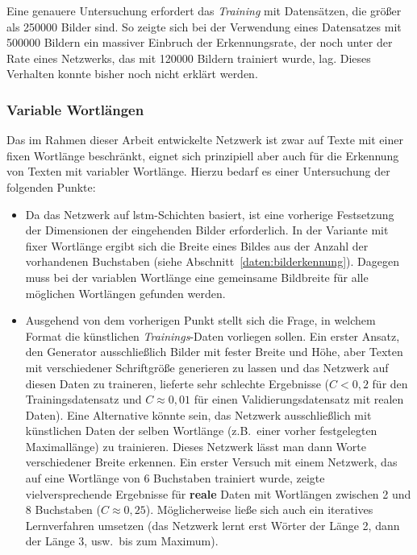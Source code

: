 Eine genauere Untersuchung erfordert das \textit{Training} mit Datensätzen, die größer als \num{250000} Bilder sind. So
zeigte sich bei der Verwendung eines Datensatzes mit \num{500000} Bildern ein massiver Einbruch der Erkennungsrate,
der noch unter der Rate eines Netzwerks, das mit \num{120000} Bildern trainiert wurde, lag. Dieses Verhalten konnte
bisher noch nicht erklärt werden.

\subsubsection{Variable Wortlängen}

Das im Rahmen dieser Arbeit entwickelte Netzwerk ist zwar auf Texte mit einer fixen Wortlänge beschränkt, eignet sich
prinzipiell aber auch für die Erkennung von Texten mit variabler Wortlänge. Hierzu bedarf es einer Untersuchung der
folgenden Punkte:

\begin{itemize}
    \item Da das Netzwerk auf \gls{lstm}-Schichten basiert, ist eine vorherige Festsetzung der Dimensionen der
          eingehenden Bilder erforderlich. In der Variante mit fixer Wortlänge ergibt sich die Breite eines Bildes
          aus der Anzahl der vorhandenen Buchstaben (siehe Abschnitt~\ref{daten:bilderkennung}). Dagegen muss bei der
          variablen Wortlänge eine gemeinsame Bildbreite für alle möglichen Wortlängen gefunden werden.
    \item Ausgehend von dem vorherigen Punkt stellt sich die Frage, in welchem Format die künstlichen
          \textit{Trainings}-Daten vorliegen sollen. Ein erster Ansatz, den Generator ausschließlich Bilder mit fester
          Breite und Höhe, aber Texten mit verschiedener Schriftgröße generieren zu lassen und das Netzwerk auf diesen
          Daten zu traineren, lieferte sehr schlechte Ergebnisse ($C < 0,2$ für den Trainingsdatensatz und
          $C \approx 0,01$ für einen Validierungsdatensatz mit realen Daten). Eine Alternative könnte sein, das Netzwerk
          ausschließlich mit künstlichen Daten der selben Wortlänge (z.B.\ einer vorher festgelegten Maximallänge) zu
          trainieren. Dieses Netzwerk lässt man dann Worte verschiedener Breite erkennen. Ein erster Versuch mit einem
          Netzwerk, das auf eine Wortlänge von 6 Buchstaben trainiert wurde, zeigte vielversprechende Ergebnisse für
          \textbf{reale} Daten mit Wortlängen zwischen 2 und 8 Buchstaben ($C \approx 0,25$). Möglicherweise ließe sich
          auch ein iteratives Lernverfahren umsetzen (das Netzwerk lernt erst Wörter der Länge 2, dann der Länge 3,
          usw.\ bis zum Maximum).
\end{itemize}

